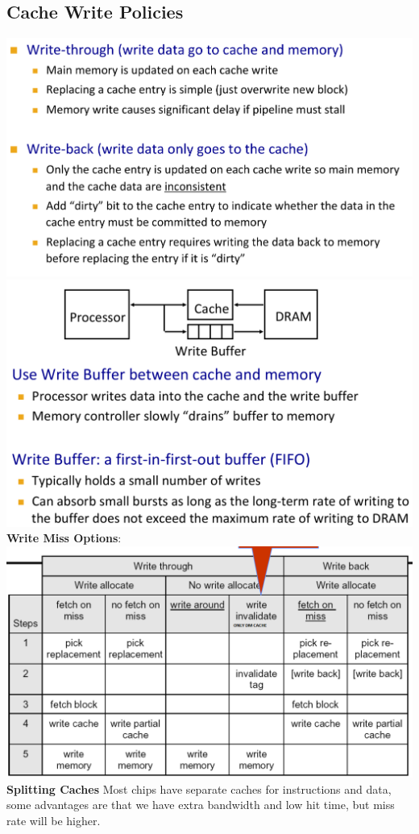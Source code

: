 \subsection*{Cache Write Policies}
\includegraphics[width=\linewidth]{png/write.png}
\includegraphics[width=\linewidth]{png/write(1).png}
\textbf{Write Miss Options}: \\
\includegraphics[width=\linewidth]{png/writemiss.png}
\textbf{Splitting Caches} Most chips have separate caches for instructions and
data, some advantages are that we have extra bandwidth and low hit time, but miss
rate will be higher.\\
\vfill\null
\columnbreak

